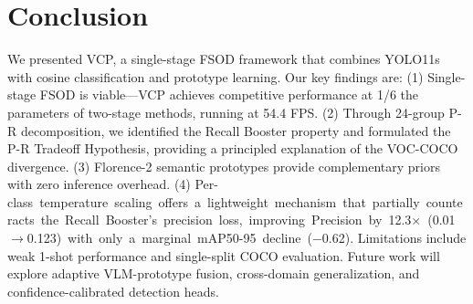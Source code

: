 \documentclass[conference]{IEEEtran}
\newcommand{\myhl}[1]{\colorbox{hlc}{\mbox{#1}}}
\begin{document}
\section{Conclusion}

We presented VCP, a single-stage FSOD framework that combines YOLO11s with cosine classification and prototype learning. Our key findings are: (1) Single-stage FSOD is viable---VCP achieves competitive performance at 1/6 the parameters of two-stage methods, running at 54.4 FPS. (2) Through 24-group P-R decomposition, we identified the Recall Booster property and formulated the P-R Tradeoff Hypothesis, providing a principled explanation of the VOC-COCO divergence. (3) Florence-2 semantic prototypes provide complementary priors with zero inference overhead. (4) \myhl{Per-class temperature scaling offers a lightweight mechanism that partially counteracts the Recall Booster's precision loss, improving Precision by 12.3$\times$ (0.01$\rightarrow$0.123) with only a marginal mAP50-95 decline ($-$0.62).} Limitations include weak 1-shot performance and single-split COCO evaluation. Future work will explore adaptive VLM-prototype fusion, cross-domain generalization, and confidence-calibrated detection heads.
\end{document}
